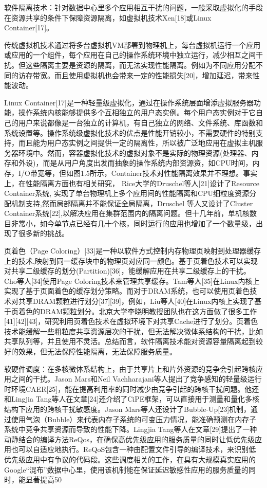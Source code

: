 软件隔离技术：针对数据中心里多个应用相互干扰的问题，一般采取虚拟化的手段在资源共享的条件下保障资源隔离，如虚拟机技术Xen[18]或Linux Container[17]。

传统虚拟机技术通过将多台虚拟机VM部署到物理机上，每台虚拟机运行一个应用或应用的一个组件，每个应用在自己的操作系统环境中独立运行，减少相互之间干扰。但这些隔离主要是资源的隔离，而无法实现性能隔离。例如为不同应用分配不同的访存带宽。而且使用虚拟机也会带来一定的性能损失[20]，增加延迟，带来性能波动。

Linux Container[17]是一种轻量级虚拟化，通过在操作系统层面增添虚拟服务器功能，操作系统内核能够提供多个互相独立的用户态实例。每个用户态实例对于它自己的用户来说都像是一台独立的计算机，有自己独立的网络、文件系统、库函数和系统设置等。操作系统级虚拟化技术的优点是性能开销较小，不需要硬件的特别支持，而且能为用户态实例之间提供一定的隔离性，所以被广泛地应用在虚拟主机服务器环境中。然而，容器虚拟化技术的虚拟对象不是实际的物理资源(处理器、内存和外设)，而是从用户角度出发而抽象的操作系统内部资源资，如CPU时间，内存，I/O带宽等，但如图1.5所示，Container技术对性能隔离效果并不理想。事实上，在性能隔离方面也有相关研究， Rice大学的Druschel等人[21]设计了Resource Container系统, 实现了单台物理机上多个应用间的性能隔离和CPU细粒度资源分配机制支持,然而局部隔离并不能保证全局隔离，Druschel 等人又设计了Cluster Container系统[22],以解决应用在集群范围内的隔离问题。但十几年前，单机核数目非常小，如今单节点已经有几十个核，同时运行的应用也增加了一个数量级，出现了很多新的挑战。

页着色（Page Coloring）[33]是一种以软件方式控制内存物理页映射到处理器缓存上的技术,映射到同一缓存块中的物理页对应同一颜色。基于页着色技术可以实现对共享二级缓存的划分(Partition)[36]，能缓解应用在共享二级缓存上的干扰。Cho等人[34]使用Page Coloring技术来管理共享缓存。Tam等人[35]在Linux内核上实现了基于页面着色的缓存划分策略。而对于DRAM系统，也可以使用页着色技术对共享DRAM颗粒进行划分[37][39]，例如，Liu等人[40]在Linux内核上实现了基于页着色的DRAM颗粒划分。北京大学李晓明教授团队也在这方面做了很多工作[41][42][43]，研究利用页着色技术在虚拟环境下对共享Cache进行了划分。页着色技术能缓解一些粗粒度共享资源层次的干扰，但无法解决微体系结构的干扰，比如共享队列等，并且使用不灵活。总结而言，软件隔离技术能对资源容量隔离起到较好的效果，但无法保障性能隔离，无法保障服务质量。

软硬件调度：在多核微体系结构上，由于共享片上和片外资源的竞争会引起跨核应用之间的干扰。Jason Mars和Neil Vachharajani等人提出了竞争感知的轻量级运行时环境CAER[25]，能在提高利用率的同时减少由竞争引起的跨核干扰问题。他还和Lingjia Tang等人在文章[24]还介绍了CiPE框架，可以直接用于测量和量化多核结构下应用的跨核干扰敏感度。Jason Mars等人还设计了Bubble-Up[23]机制，通过使用气泡（Bubble）来代表内存子系统的可变压力情况，能准确预测在内存子系统中竞争共享资源而导致的性能下降。Lingjia Tang等人在文章[29]提出了一种动静结合的编译方法ReQos，在确保高优先级应用的服务质量的同时让低优先级应用也可以自适应地执行。ReQoS包含一种由配置文件引导的编译技术，来识别低优先级应用中有争议的代码段。这些调度相关的工作，在具有大规模真实应用的Google“混布”数据中心里，使用该机制能在保证延迟敏感性应用的服务质量的同时，能显著提高50%

